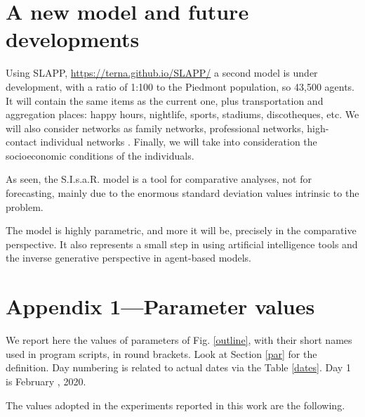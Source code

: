 \documentclass[graybox]{svmult}
\begin{document}
\section{A new model and future developments}
\label{newModel}

Using SLAPP, \href{https://terna.github.io/SLAPP/}{https://terna.github.io/SLAPP/} a second model is under development, with a ratio of 1:100 to the Piedmont population, so 43,500 agents. It will contain the same items as the current one, plus transportation and aggregation places: happy hours, nightlife, sports, stadiums, discotheques, etc. We will also consider networks as family networks, professional networks, high-contact individual networks \cite{manzo2020}. Finally, we will take into consideration the socioeconomic conditions of the individuals.

As seen, the S.I.s.a.R. model is a tool for comparative analyses, not for forecasting, mainly due to the enormous standard deviation values intrinsic to the problem. 

The model is highly parametric, and more it will be, precisely in the comparative perspective. It also represents a small step in using artificial intelligence tools and the inverse generative perspective \cite{inverseGen} in agent-based models.


\section{Appendix 1---Parameter values}
\label{app1}

We report here the values of parameters of Fig. \ref{outline}, with their short names used in program scripts, in round brackets. Look at Section \ref{par} for the definition. Day numbering is related to actual dates via the Table \ref{dates}. Day 1 is February , 2020.

The values adopted in the experiments reported in this work are the following.
\end{document}
